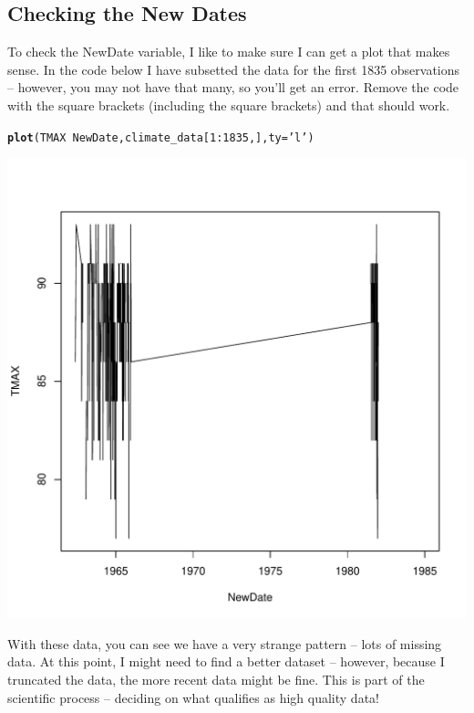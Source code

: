 \documentclass{article}\usepackage[]{graphicx}\usepackage[]{color}
\makeatletter
\def\maxwidth{ %
  \ifdim\Gin@nat@width>\linewidth
    \linewidth
  \else
    \Gin@nat@width
  \fi
}
\newcommand{\hlnum}[1]{\textcolor[rgb]{0.686,0.059,0.569}{#1}}%
\newcommand{\hlstr}[1]{\textcolor[rgb]{0.192,0.494,0.8}{#1}}%
\newcommand{\hlopt}[1]{\textcolor[rgb]{0,0,0}{#1}}%
\newcommand{\hlstd}[1]{\textcolor[rgb]{0.345,0.345,0.345}{#1}}%
\newcommand{\hlkwc}[1]{\textcolor[rgb]{0.333,0.667,0.333}{#1}}%
\newcommand{\hlkwd}[1]{\textcolor[rgb]{0.737,0.353,0.396}{\textbf{#1}}}%
\newenvironment{kframe}{%
 \def\at@end@of@kframe{}%
 \ifinner\ifhmode%
  \def\at@end@of@kframe{\end{minipage}}%
  \begin{minipage}{\columnwidth}%
 \fi\fi%
 \def\FrameCommand##1{\hskip\@totalleftmargin \hskip-\fboxsep
 \colorbox{shadecolor}{##1}\hskip-\fboxsep
     \hskip-\linewidth \hskip-\@totalleftmargin \hskip\columnwidth}%
 \MakeFramed {\advance\hsize-\width
   \@totalleftmargin\z@ \linewidth\hsize
   \@setminipage}}%
 {\par\unskip\endMakeFramed%
 \at@end@of@kframe}
\newenvironment{knitrout}{}{} %
\makeatother
\begin{document}
\subsection{Checking the New Dates}

To check the NewDate variable, I like to make sure I can get a plot that makes sense. In the code below I have subsetted the data for the first 1835 observations -- however, you may not have that many, so you'll get an error. Remove the code with the square brackets (including the square brackets) and that should work. 

\begin{knitrout}
\color{fgcolor}\begin{kframe}
\begin{alltt}
\hlkwd{plot}\hlstd{(TMAX}\hlopt{~}\hlstd{NewDate, climate_data[}\hlnum{1}\hlopt{:}\hlnum{1835}\hlstd{,],} \hlkwc{ty}\hlstd{=}\hlstr{'l'}\hlstd{)}
\end{alltt}
\end{kframe}
\includegraphics[width=\maxwidth]{figure/unnamed-chunk-14-1} 

\end{knitrout}


With these data, you can see we have a very strange pattern -- lots of missing data. At this point, I might need to find a better dataset -- however, because I truncated the data, the more recent data might be fine. This is part of the scientific process -- deciding on what qualifies as high quality data!
\end{document}
